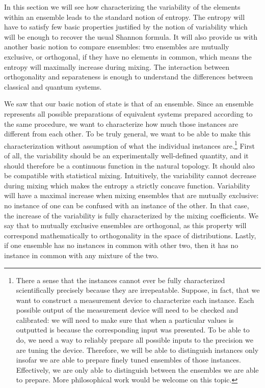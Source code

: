 In this section we will see how characterizing the variability of the elements within an ensemble leads to the standard notion of entropy. The entropy will have to satisfy few basic properties justified by the notion of variability which will be enough to recover the usual Shannon formula. It will also provide us with another basic notion to compare ensembles: two ensembles are mutually exclusive, or orthogonal, if they have no elements in common, which means the entropy will maximally increase during mixing. The interaction between orthogonality and separateness is enough to understand the differences between classical and quantum systems.

We saw that our basic notion of state is that of an ensemble. Since an ensemble represents all possible preparations of equivalent systems prepared according to the same procedure, we want to characterize how much those instances are different from each other. To be truly general, we want to be able to make this characterization without assumption of what the individual instances are.\footnote{There a sense that the instances cannot ever be fully characterized scientifically precisely because they are irrepeatable. Suppose, in fact, that we want to construct a measurement device to characterize each instance. Each possible output of the measurement device will need to be checked and calibrated: we will need to make sure that when a particular values is outputted is because the corresponding input was presented. To be able to do, we need a way to reliably prepare all possible inputs to the precision we are tuning the device. Therefore, we will be able to distinguish instances only insofar we are able to prepare finely tuned ensembles of those instances. Effectively, we are only able to distinguish between the ensembles we are able to prepare. More philosophical work would be welcome on this topic.} First of all, the variability should be an experimentally well-defined quantity, and it should therefore be a continuous function in the natural topology. It should also be compatible with statistical mixing. Intuitively, the variability cannot decrease during mixing which makes the entropy a strictly concave function. Variability will have a maximal increase when mixing ensembles that are mutually exclusive: no instance of one can be confused with an instance of the other. In that case, the increase of the variability is fully characterized by the mixing coefficients. We say that to mutually exclusive ensembles are orthogonal, as this property will correspond mathematically to orthogonality in the space of distributions. Lastly, if one ensemble has no instances in common with other two, then it has no instance in common with any mixture of the two.

